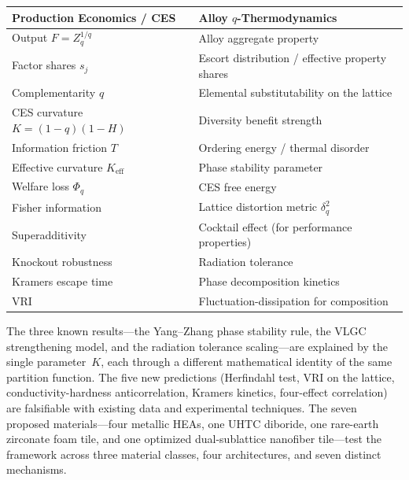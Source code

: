 \documentclass[12pt,letterpaper]{article}
\theoremstyle{definition}
\begin{document}
\begin{center}
\begin{tabular}{@{}ll@{}}
\toprule
\textbf{Production Economics / CES} & \textbf{Alloy $q$-Thermodynamics} \\
\midrule
Output $F = Z_q^{1/q}$ & Alloy aggregate property \\
Factor shares $s_j$ & Escort distribution / effective property shares \\
Complementarity $q$ & Elemental substitutability on the lattice \\
CES curvature $K = (1-q)(1-H)$ & Diversity benefit strength \\
Information friction $T$ & Ordering energy / thermal disorder \\
Effective curvature $K_{\mathrm{eff}}$ & Phase stability parameter \\
Welfare loss $\Phi_q$ & CES free energy \\
Fisher information & Lattice distortion metric $\delta_q^2$ \\
Superadditivity & Cocktail effect (for performance properties) \\
Knockout robustness & Radiation tolerance \\
Kramers escape time & Phase decomposition kinetics \\
VRI & Fluctuation-dissipation for composition \\
\bottomrule
\end{tabular}
\end{center}

The three known results---the Yang--Zhang phase stability rule, the VLGC strengthening model, and the radiation tolerance scaling---are explained by the single parameter~$K$, each through a different mathematical identity of the same partition function.  The five new predictions (Herfindahl test, VRI on the lattice, conductivity-hardness anticorrelation, Kramers kinetics, four-effect correlation) are falsifiable with existing data and experimental techniques.  The seven proposed materials---four metallic HEAs, one UHTC diboride, one rare-earth zirconate foam tile, and one optimized dual-sublattice nanofiber tile---test the framework across three material classes, four architectures, and seven distinct mechanisms.
\end{document}

